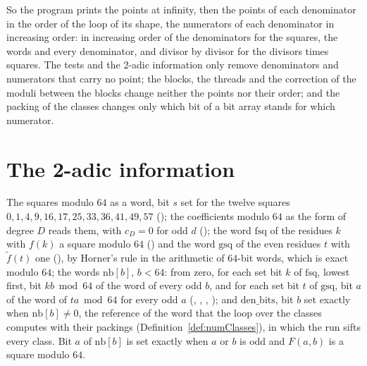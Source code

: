 So the program prints the points at infinity, then the points of each denominator in the order of
the loop of its shape, the numerators of each denominator in increasing order: in increasing order
of the denominators for the squares, the words and every denominator, and divisor by divisor for the
divisors times squares. The tests and the 2-adic information only remove denominators and
numerators that carry no point; the blocks, the threads and the correction of the moduli between
the blocks change neither the points nor their order; and the packing of the classes changes only
which bit of a bit array stands for which numerator.

\section{The 2-adic information}\label{sec:twoAdic}

\begin{definition}\label{def:twoAdic}
  \leanok
  The squares modulo $64$ as a word, bit $s$ set for the twelve squares
  $0, 1, 4, 9, 16, 17, 25, 33, 36, 41, 49, 57$ (); the coefficients
  modulo $64$ as the form of degree $D$ reads them, with $c_D = 0$ for odd $d$
  (); the word $\mathrm{fsq}$ of the residues $k$ with $f(k)$ a
  square modulo $64$ () and the word $\mathrm{gsq}$ of the even
  residues $t$ with $\tilde f(t)$ one (), by Horner's rule in the
  arithmetic of $64$-bit words, which is exact modulo $64$; the words $\mathrm{nb}[b]$, $b < 64$:
  from zero, for each set bit $k$ of $\mathrm{fsq}$, lowest first, bit $k b \bmod 64$ of the word of
  every odd $b$, and for each set bit $t$ of $\mathrm{gsq}$, bit $a$ of the word of $t a \bmod 64$
  for every odd $a$ (, ,
  , ); and
  $\mathrm{den\_bits}$, bit $b$ set exactly when $\mathrm{nb}[b] \ne 0$, the reference of the word
  that the loop over the classes computes with their packings (Definition~\ref{def:numClasses}), in
  which the run sifts every class. Bit $a$ of $\mathrm{nb}[b]$ is set exactly when $a$ or $b$ is odd
  and $F(a, b)$ is a square modulo $64$.
\end{definition}

